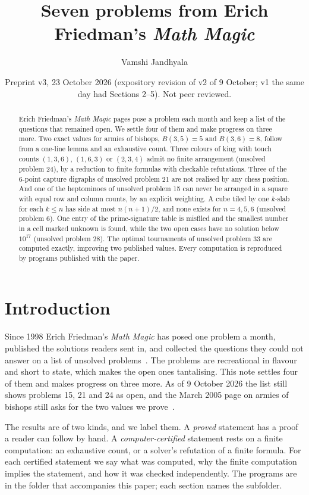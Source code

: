 \documentclass[11pt]{amsart}
\title{Seven problems from Erich Friedman's \emph{Math Magic}}
\author{Vamshi Jandhyala}
\date{Preprint v3, 23 October 2026 (expository revision of v2 of 9 October; v1 the same day had Sections 2--5). Not peer reviewed.}
\theoremstyle{remark}
\begin{document}
\begin{abstract}
Erich Friedman's \emph{Math Magic} pages pose a problem each month and keep a list of the questions
that remained open. We settle four of them and make progress on three more. Two exact values for armies of bishops,
$B(3,5)=5$ and $B(3,6)=8$, follow from a one-line lemma and an exhaustive count. Three colours of
king with touch counts $(1,3,6)$, $(1,6,3)$ or $(2,3,4)$ admit no finite arrangement (unsolved
problem 24), by a reduction to finite formulas with checkable refutations. Three of the
6-point capture digraphs of unsolved problem 21 are not realised by any chess position. And one of
the heptominoes of unsolved problem 15 can never be arranged in a square with equal row and column
counts, by an explicit weighting. A cube tiled by one $k$-slab for each $k\le n$ has side at most
$n(n+1)/2$, and none exists for $n=4,5,6$ (unsolved problem 6). One entry of the prime-signature
table is misfiled and the smallest number in a cell marked unknown is found, while the two open
cases have no solution below $10^{17}$ (unsolved problem 28). The optimal tournaments of unsolved
problem 33 are computed exactly, improving two published values. Every computation is reproduced
by programs published with the paper.
\end{abstract}
\maketitle

\section{Introduction}

Since 1998 Erich Friedman's \emph{Math Magic} has posed one problem a month, published the
solutions readers sent in, and collected the questions they could not answer on a list of unsolved
problems~\cite{unsolved}. The problems are recreational in flavour and short to state, which
makes the open ones tantalising. This note settles four of them and makes progress on three more. As of 9 October 2026 the list still
shows problems 15, 21 and 24 as open, and the March 2005 page on armies of bishops still asks for the
two values we prove~\cite{bishops}.

The results are of two kinds, and we label them. A \emph{proved} statement has a proof a reader can
follow by hand. A \emph{computer-certified} statement rests on a finite computation: an exhaustive
count, or a solver's refutation of a finite formula. For each certified statement we say what was
computed, why the finite computation implies the statement, and how it was checked independently.
The programs are in the  folder that accompanies this paper; each section names the
subfolder.
\end{document}
